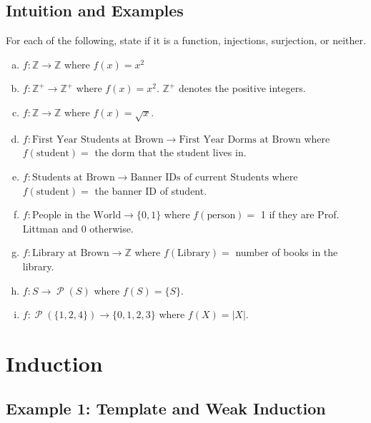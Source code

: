 \documentclass[12pt,letterpaper]{article}
\newcommand\Z{\mathbb Z}
\newcommand\Pow{\ensuremath{\operatorname{\mathcal{P}}}}
\begin{document}
\subsection{Intuition and Examples}
\begin{mdframed}
For each of the following, state if it is a function, injections, surjection, or neither.
\begin{enumerate}[(a)]
    \item $f : \Z \rightarrow \Z$ where $f(x) = x^2$
    
    \item $f : \Z^+ \rightarrow \Z^+$ where $f(x) = x^2$. $\Z^+$ denotes the positive integers.
    
    \item $f: \Z \rightarrow \Z$ where $f(x) = \sqrt{x}$.
    
    \item $f : \text{First Year Students at Brown} \rightarrow \text{First Year Dorms at Brown}$ where $f(\text{student}) = $ the dorm that the student lives in.
    
    \item $f : \text{Students at Brown} \rightarrow \text{Banner IDs of current Students}$ where $f(\text{student}) = $ the banner ID of student.
    
    \item $f : \text{People in the World} \rightarrow  \{0,1\}$ where $f(\text{person}) = $ 1 if they are Prof. Littman and 0 otherwise.
    
    \item $f : \text{Library at Brown} \rightarrow \Z$ where $f(\text{Library}) = $ number of books in the library.
    
    \item $f: S \rightarrow \Pow{(S)}$ where $f(S) = \{S\}$.
    
    \item $f: \Pow{(\{1,2,4\})} \rightarrow \{0,1,2,3\}$ where $f(X) = |X|$.

\end{enumerate}
\end{mdframed}

\section{Induction}

\subsection{Example 1: Template and Weak Induction}
\end{document}

